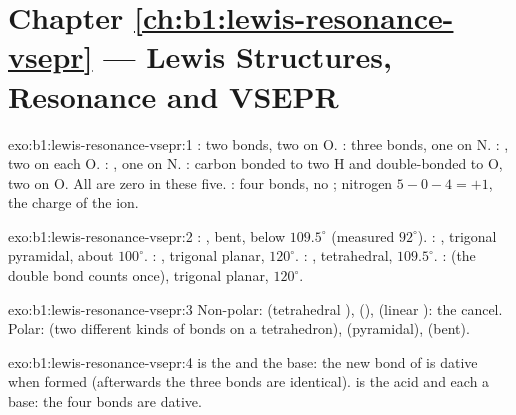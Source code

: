 \section*{Chapter \ref{ch:b1:lewis-resonance-vsepr} --- Lewis Structures, Resonance and VSEPR}

\begin{solution}{exo:b1:lewis-resonance-vsepr:1}
: two  bonds, two  on O. : three
 bonds, one  on N. : , two 
on each O. : , one  on N. : carbon
bonded to two H and double-bonded to O, two  on O. All  are zero in these five. : four  bonds, no ; nitrogen $5 - 0 - 4 = +1$, the charge of the ion.
\end{solution}

\begin{solution}{exo:b1:lewis-resonance-vsepr:2}
: , bent, below $109.5^\circ$ (measured $92^\circ$).
: , trigonal pyramidal, about $100^\circ$.
: , trigonal planar, $120^\circ$. : ,
tetrahedral, $109.5^\circ$. :  (the double bond
counts once), trigonal planar, $120^\circ$.
\end{solution}

\begin{solution}{exo:b1:lewis-resonance-vsepr:3}
Non-polar:  (tetrahedral ),  (),
 (linear ): the  cancel. Polar: 
(two different kinds of bonds on a tetrahedron),  (pyramidal),
 (bent).
\end{solution}

\begin{solution}{exo:b1:lewis-resonance-vsepr:4}
 is the  and  the base: the new  bond of
 is dative when formed (afterwards the three  bonds are
identical).  is the acid and each  a base: the four
 bonds are dative.
\end{solution}

